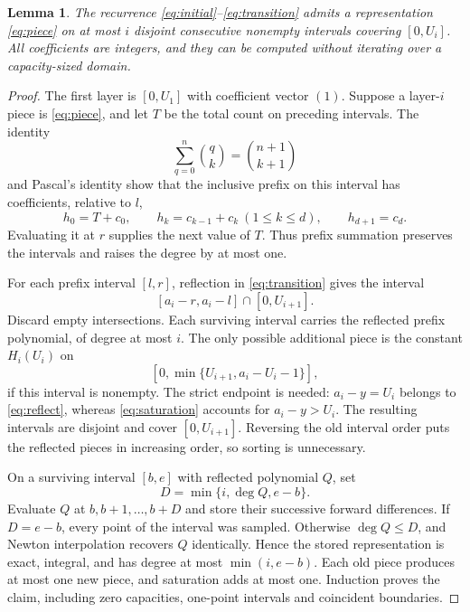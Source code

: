 \documentclass[11pt]{article}
\newtheorem{lemma}[theorem]{Lemma}
\theoremstyle{remark}
\DeclareMathOperator{\degp}{deg}
\begin{document}
\begin{lemma}\label{lem:pieces}
The recurrence \eqref{eq:initial}--\eqref{eq:transition} admits a
representation \eqref{eq:piece} on at most $i$ disjoint consecutive
nonempty intervals covering $[0,U_i]$. All coefficients are integers,
and they can be computed without iterating over a capacity-sized domain.
\end{lemma}
\begin{proof}
The first layer is $[0,U_1]$ with coefficient vector $(1)$.
Suppose a layer-$i$ piece is \eqref{eq:piece}, and let $T$ be the
total count on preceding intervals. The identity
\[
 \sum_{q=0}^n\binom qk=\binom{n+1}{k+1}
\]
and Pascal's identity show that the inclusive prefix on this interval
has coefficients, relative to $l$,
\begin{equation}\label{eq:prefixcoeff}
 h_0=T+c_0,\qquad h_k=c_{k-1}+c_k\ (1\leq k\leq d),
 \qquad h_{d+1}=c_d.
\end{equation}
Evaluating it at $r$ supplies the next value of $T$.
Thus prefix summation preserves the intervals and raises the degree
by at most one.

For each prefix interval $[l,r]$, reflection in
\eqref{eq:transition} gives the interval
\begin{equation}\label{eq:reflect}
 [a_i-r,a_i-l]\cap[0,U_{i+1}].
\end{equation}
Discard empty intersections. Each surviving interval carries the
reflected prefix polynomial, of degree at most $i$.
The only possible additional piece is the constant $H_i(U_i)$ on
\begin{equation}\label{eq:saturation}
 [0,\min\{U_{i+1},a_i-U_i-1\}],
\end{equation}
if this interval is nonempty. The strict endpoint is needed:
$a_i-y=U_i$ belongs to \eqref{eq:reflect}, whereas
\eqref{eq:saturation} accounts for $a_i-y>U_i$.
The resulting intervals are disjoint and cover $[0,U_{i+1}]$.
Reversing the old interval order puts the reflected pieces in
increasing order, so sorting is unnecessary.

On a surviving interval $[b,e]$ with reflected polynomial $Q$, set
\[
 D=\min\{i,\degp Q,e-b\}.
\]
Evaluate $Q$ at $b,b+1,\ldots,b+D$ and store their successive
forward differences. If $D=e-b$, every point of the interval was
sampled. Otherwise $\degp Q\leq D$, and Newton interpolation
recovers $Q$ identically. Hence the stored representation is exact,
integral, and has degree at most $\min(i,e-b)$.
Each old piece produces at most one new piece, and saturation adds
at most one. Induction proves the claim, including zero capacities,
one-point intervals and coincident boundaries.
\end{proof}
\end{document}
